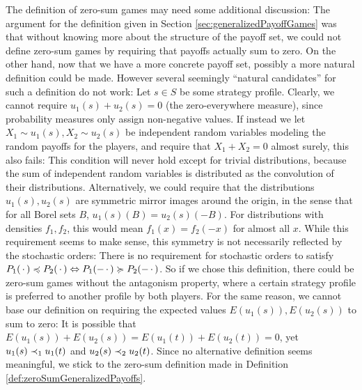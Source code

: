 \documentclass[a4paper,DIV=11]{scrreprt}
\theoremstyle{definition}
\begin{document}
    The definition of zero-sum games may need some additional discussion: The argument for the definition given in Section \ref{sec:generalizedPayoffGames} was that without knowing more about the structure of the payoff set, we could not define zero-sum games by requiring that payoffs actually sum to zero.
    On the other hand, now that we have a more concrete payoff set, possibly a more natural definition could be made.    
    However several seemingly “natural candidates” for such a definition do not work: Let $s \in S$ be some strategy profile.
    Clearly, we cannot require $u_1(s) + u_2(s) = 0$ (the zero-everywhere measure), since probability measures only assign non-negative values.
    If instead we let $X_1 \sim u_1(s), X_2 \sim u_2(s)$ be independent random variables modeling the random payoffs for the players, and require that $X_1 + X_2 = 0$ almost surely, this also fails: This condition will never hold except for trivial distributions, because the sum of independent random variables is distributed as the convolution of their distributions.
    Alternatively, we could require that the distributions $u_1(s), u_2(s)$ are symmetric mirror images around the origin, in the sense that for all Borel sets $B$, $u_1(s)(B) = u_2(s)(-B)$. For distributions with densities $f_1, f_2$, this would mean $f_1(x) = f_2(-x)$ for almost all $x$.
    While this requirement seems to make sense, this symmetry is not necessarily reflected by the stochastic orders: There is no requirement for stochastic orders to satisfy $P_1(\,\cdot\,) \preccurlyeq P_2(\,\cdot\,) \Leftrightarrow P_1(-\,\cdot\,) \succcurlyeq P_2(-\,\cdot\,)$. So if we chose this definition, there could be zero-sum games without the antagonism property, where a certain strategy profile is preferred to another profile by both players.
    For the same reason, we cannot base our definition on requiring the expected values $E(u_1(s)), E(u_2(s))$ to sum to zero: It is possible that $E(u_1(s)) + E(u_2(s)) = E(u_1(t)) + E(u_2(t)) = 0$, yet $u_1(s) \dstrnonpref_1 u_1(t)$ and $u_2(s) \dstrnonpref_2 u_2(t)$.
    Since no alternative definition seems meaningful, we stick to the zero-sum definition made in Definition \ref{def:zeroSumGeneralizedPayoffs}.
\end{document}
